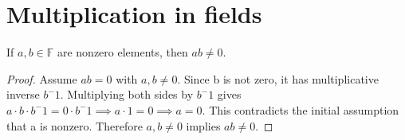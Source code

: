 \section{Multiplication in fields}
If $a, b \in \mathbb{F}$ are nonzero elements, then $ab \neq 0$.
\begin{proof} 
    Assume $ab=0$ with $a, b \neq 0$. 
    Since b is not zero, it has multiplicative inverse $b^-1$.
    Multiplying both sides by $b^-1$ gives 
    $a \cdot b \cdot b^-1=0 \cdot b^-1  \implies a \cdot 1 = 0 \implies a = 0$.
    This contradicts the initial assumption that a is nonzero.
    Therefore $a, b \neq 0$ implies $ab \neq 0$.
\end{proof}